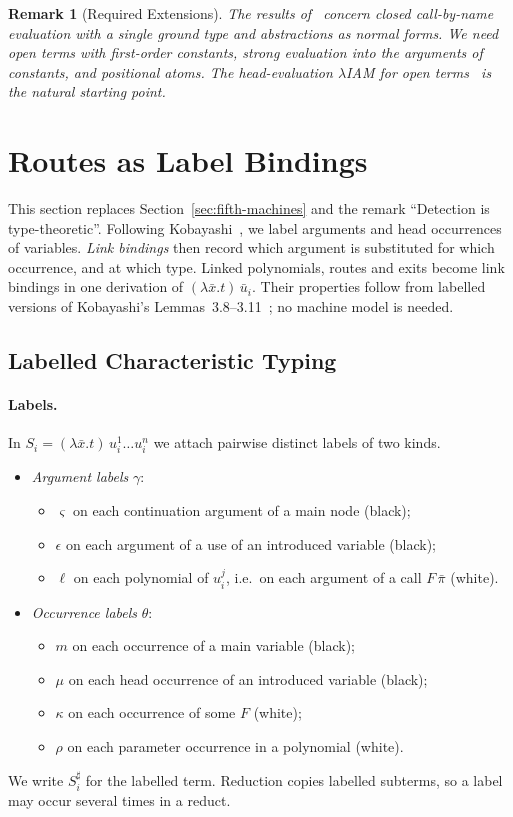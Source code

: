 \documentclass[10pt,a4paper]{article}
\theoremstyle{plain}%
\newtheorem{remark}[theorem]{Remark}
\begin{document}
\begin{remark}[Required Extensions]
The results of~\cite{AccattoliDLV21} concern closed call-by-name evaluation with a single ground type and abstractions as normal forms.
We need open terms with first-order constants, strong evaluation into the arguments of constants, and positional atoms.
The head-evaluation $\lambda$IAM for open terms~\cite{AccattoliDLV20} is the natural starting point.
\end{remark}

\section{Routes as Label Bindings}
\label{sec:fifth-labels}

This section replaces Section~\ref{sec:fifth-machines} and the remark ``Detection is type-theoretic''.
Following Kobayashi~\cite{Kobayashi13}, we label arguments and head occurrences of variables.
\emph{Link bindings} then record which argument is substituted for which occurrence, and at which type.
Linked polynomials, routes and exits become link bindings in one derivation of $(\lambda\bar x.t)\,\bar u_i$.
Their properties follow from labelled versions of Kobayashi's Lemmas~3.8--3.11~\cite{Kobayashi13}; no machine model is needed.

\subsection{Labelled Characteristic Typing}

\paragraph{Labels.}
In $S_i = (\lambda\bar x.t)\,u_i^1\ldots u_i^n$ we attach pairwise distinct labels of two kinds.
\begin{itemize}
\item \emph{Argument labels} $\gamma$:
  \begin{itemize}
  \item $\varsigma$ on each continuation argument of a main node (black);
  \item $\epsilon$ on each argument of a use of an introduced variable (black);
  \item $\ell$ on each polynomial of $u_i^j$, i.e.\ on each argument of a call $F\,\bar\pi$ (white).
  \end{itemize}
\item \emph{Occurrence labels} $\theta$:
  \begin{itemize}
  \item $m$ on each occurrence of a main variable (black);
  \item $\mu$ on each head occurrence of an introduced variable (black);
  \item $\kappa$ on each occurrence of some $F$ (white);
  \item $\rho$ on each parameter occurrence in a polynomial (white).
  \end{itemize}
\end{itemize}
We write $S_i^\sharp$ for the labelled term.
Reduction copies labelled subterms, so a label may occur several times in a reduct.
\end{document}
